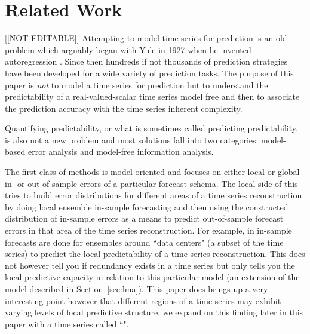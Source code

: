 \section{Related Work }\label{sec:related}
{\color{red}[[NOT EDITABLE]]}
Attempting to model time series for prediction is an old problem which arguably began with Yule in 1927 when he invented autoregression \cite{Yule27}. Since then hundreds if not thousands of prediction strategies have been developed for a wide variety of prediction tasks. The purpose of this paper is \emph{not} to model a time series for prediction but to understand the predictability of a real-valued-scalar time series model free and then to associate the prediction accuracy with the time series inherent complexity. 

Quantifying predictability, or what is sometimes called predicting predictability, is also not a new problem and most solutions fall into two categories: model-based error analysis and model-free information analysis.





The first class of methods is model oriented and focuses on either local or global in- or out-of-sample errors of a particular forecast schema. The local side of this tries to build error distributions for different areas of a time series reconstruction by doing local ensemble in-sample forecasting and then using the constructed distribution of in-sample errors as a means to predict out-of-sample forecast errors in that area of the time series reconstruction. For example, in \cite{Smith199250} in-sample forecasts are done for ensembles around ``data centers" (a subset of the time series) to predict the local predictability of a time series reconstruction. This does not however tell you if redundancy exists in a time series but only tells you the local predictive capacity in relation to this particular model (an extension of the model described in Section~\ref{sec:lma}). This paper does brings up a very interesting point however that different regions of a time series may exhibit varying levels of local predictive structure, we expand on this finding later in this paper with a time series called ``\svd".


